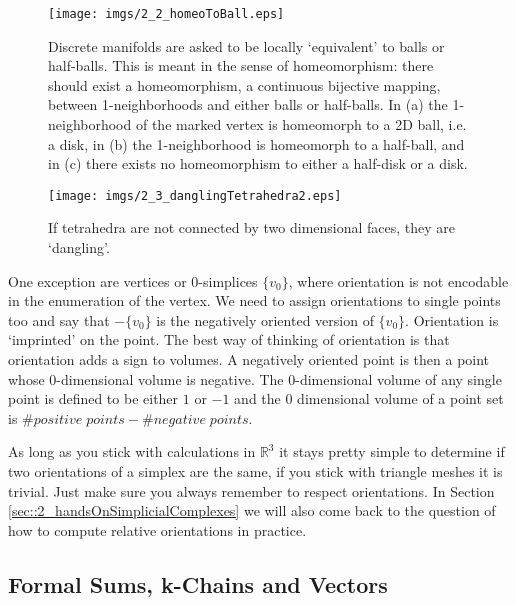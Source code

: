 \begin{figure}%
\begin{center}
\texttt{[image: imgs/2\_2\_homeoToBall.eps]}%
\end{center}
\vspace{ -0.5cm}
\caption{Discrete manifolds are asked to be locally `equivalent' to balls or half-balls. This is meant in the sense of homeomorphism: there should exist a homeomorphism, a continuous bijective mapping, between 1-neighborhoods and either balls or half-balls. In (a) the 1-neighborhood of the marked vertex is homeomorph to a 2D ball, i.e. a disk, in (b) the 1-neighborhood is homeomorph to a half-ball, and in (c) there exists no homeomorphism to either a half-disk or a disk.}%
\label{fig::2_2_homeoToBall}%
\end{figure}

\begin{figure}
\begin{center}
\texttt{[image: imgs/2\_3\_danglingTetrahedra2.eps]}
\caption{If tetrahedra are not connected by two dimensional faces, they are `dangling'.}
\label{fig::2_2_dangling2}
\end{center}
\end{figure}


One exception are vertices or 0-simplices $\{v_0\}$, where orientation is not encodable in the enumeration of the vertex. We need to assign orientations to single points too and say that $-\{v_0\}$ is the negatively oriented version of $\{v_0\}$. Orientation is `imprinted' on the point. The best way of thinking of orientation is that orientation adds a sign to volumes. A negatively oriented point is then a point whose $0$-dimensional volume is negative. The $0$-dimensional volume of any single point is defined to be either $1$ or $-1$ and the 0 dimensional volume of a point set is $\#positive\; points - \#negative\; points$.

As long as you stick with calculations in $\mathbb R^3$ it stays pretty simple to determine if two orientations of a simplex are the same, if you stick with triangle meshes it is trivial. Just make sure you always remember to respect orientations. In Section \ref{sec::2_handsOnSimplicialComplexes} we will also come back to the question of how to compute relative orientations in practice.


\subsection{Formal Sums, k-Chains and Vectors}
\label{subsec::formalsums}

